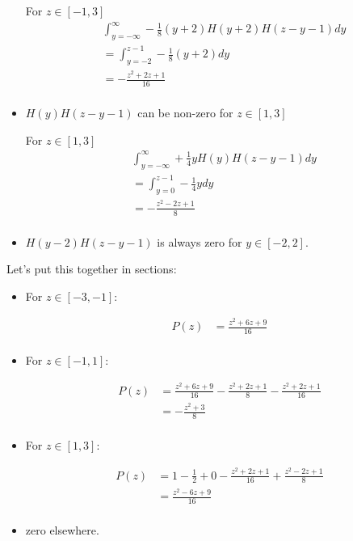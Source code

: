 \begin{itemize}
    For $z \in [-1, 3]$
    \begin{align*}
        &\int_{y =-\infty}^{\infty} - \frac{1}{8}(y+2)H(y+2)H(z-y-1) dy \\
        &= \int_{y=-2}^{z-1} - \frac{1}{8}(y+2) dy \\
        &= -\frac{z^2+2z+1}{16} \\
    \end{align*}

    \item $H(y)H(z-y-1)$ can be non-zero for $z \in [1,3]$

    For $z \in [1, 3]$
    \begin{align*}
        &\int_{y =-\infty}^{\infty} + \frac{1}{4}y H(y)H(z-y-1) dy \\
        &= \int_{y=0}^{z-1} - \frac{1}{4}y dy \\
        &= - \frac{z^2-2z+1}{8} \\
    \end{align*}

    \item $H(y-2)H(z-y-1)$ is always zero for $y \in [-2,2]$.

\end{itemize}

Let's put this together in sections:
\begin{itemize}
    \item For $z \in [-3, -1]$:
    
    \begin{align*}
        P(z) &= \frac{z^2+6z+9}{16} \\
    \end{align*}
    
    \item For $z \in [-1,1]$:
    
    \begin{align*}
        P(z) &= \frac{z^{2}+6z+9}{16}-\frac{z^{2}+2z+1}{8}-\frac{z^{2}+2z+1}{16} \\
        &= -\frac{z^{2}+3}{8} \\
    \end{align*}

    \item For $z \in [1,3]$:
    
    \begin{align*}
        P(z) &= 1-\frac{1}{2}+0-\frac{z^{2}+2z+1}{16}+\frac{z^{2}-2z+1}{8}\\
        &= \frac{z^2 -6z + 9}{16}\\
    \end{align*}

    \item zero elsewhere.
\end{itemize}

